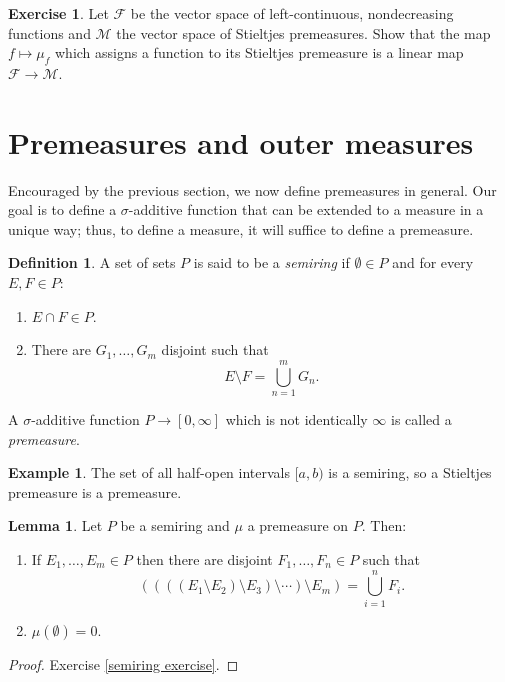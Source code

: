 \documentclass[12pt]{book}
\newcommand{\dfn}[1]{\emph{#1}\index{#1}}
\theoremstyle{definition}
\newtheorem{lemma}[theorem]{Lemma}
\newtheorem{definition}[theorem]{Definition}
\newtheorem{example}[theorem]{Example}
\newtheorem{exercise}[theorem]{Exercise}
\begin{document}
\begin{exercise}
Let $\mathcal F$ be the vector space of left-continuous, nondecreasing functions and $\mathcal M$ the vector space of Stieltjes premeasures.
Show that the map $f \mapsto \mu_f$ which assigns a function to its Stieltjes premeasure is a linear map $\mathcal F \to \mathcal M$.
\end{exercise}

\section{Premeasures and outer measures}
Encouraged by the previous section, we now define premeasures in general.
Our goal is to define a $\sigma$-additive function that can be extended to a measure in a unique way; thus, to define a measure, it will suffice to define a premeasure.

\begin{definition}
A set of sets $P$ is said to be a \dfn{semiring} if $\emptyset \in P$ and for every $E, F \in P$:
\begin{enumerate}
\item $E \cap F \in P$.
\item There are $G_1, \dots, G_m$ disjoint such that
$$E \setminus F = \bigcup_{n=1}^m G_n.$$
\end{enumerate}
A $\sigma$-additive function $P \to [0, \infty]$ which is not identically $\infty$ is called a \dfn{premeasure}.
\end{definition}

\begin{example}
The set of all half-open intervals $[a, b)$ is a semiring, so a Stieltjes premeasure is a premeasure.
\end{example}

\begin{lemma}
\label{semiring prop 1}
Let $P$ be a semiring and $\mu$ a premeasure on $P$. Then:
\begin{enumerate}
\item If $E_1, \dots, E_m \in P$ then there are disjoint $F_1, \dots, F_n \in P$ such that
$$((((E_1 \setminus E_2) \setminus E_3) \setminus \cdots) \setminus E_m) = \bigcup_{i=1}^n F_i.$$
\item $\mu(\emptyset) = 0$.
\end{enumerate}
\end{lemma}
\begin{proof}
Exercise \ref{semiring exercise}.
\end{proof}
\end{document}
